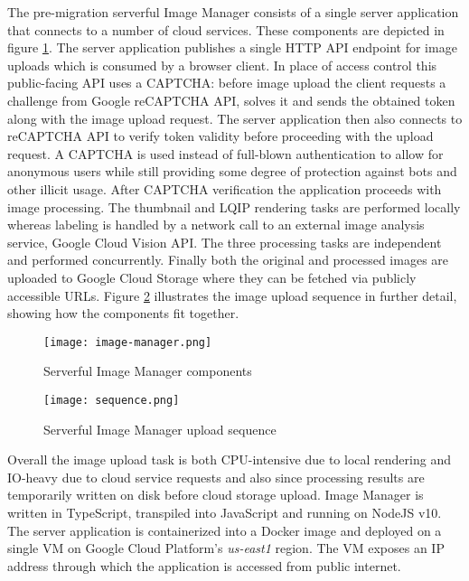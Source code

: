 The pre-migration serverful Image Manager consists of a single server application that connects to a number of cloud services. These components are depicted in figure \ref{fig:serverfulArchitecture}. The server application publishes a single HTTP API endpoint for image uploads which is consumed by a browser client. In place of access control this public-facing API uses a CAPTCHA: before image upload the client requests a challenge from Google reCAPTCHA API, solves it and sends the obtained token along with the image upload request. The server application then also connects to reCAPTCHA API to verify token validity before proceeding with the upload request. A CAPTCHA is used instead of full-blown authentication to allow for anonymous users while still providing some degree of protection against bots and other illicit usage. After CAPTCHA verification the application proceeds with image processing. The thumbnail and LQIP rendering tasks are performed locally whereas labeling is handled by a network call to an external image analysis service, Google Cloud Vision API. The three processing tasks are independent and performed concurrently. Finally both the original and processed images are uploaded to Google Cloud Storage where they can be fetched via publicly accessible URLs. Figure \ref{fig:serverfulSequence} illustrates the image upload sequence in further detail, showing how the components fit together.

\begin{figure}[h]
  \centering
  \texttt{[image: image-manager.png]}
  \caption{Serverful Image Manager components}
  \label{fig:serverfulArchitecture}
\end{figure}

\begin{figure}[h]
  \centering
  \texttt{[image: sequence.png]}
  \caption{Serverful Image Manager upload sequence}
  \label{fig:serverfulSequence}
\end{figure}

Overall the image upload task is both CPU-intensive due to local rendering and IO-heavy due to cloud service requests and also since processing results are temporarily written on disk before cloud storage upload. Image Manager is written in TypeScript, transpiled into JavaScript and running on NodeJS v10. The server application is containerized into a Docker image and deployed on a single VM on Google Cloud Platform's \textit{us-east1} region. The VM exposes an IP address through which the application is accessed from public internet.


